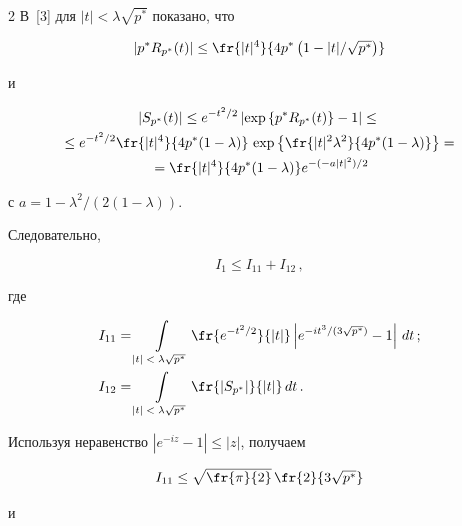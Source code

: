 \begin{multicols}{2}
В~[3] для  $|t| < \lambda \sqrt{p^*}$  показано, что

\begin{equation*}

\left\vert p^* R_{p^*}(t)\right\vert \leq \fr{|t|^4}{4p^*\left(1 -|t|/\sqrt{p^*}\right)}

\end{equation*}

и

\begin{multline*}

\left\vert S_{p^*}(t)\right\vert \leq e^{-t^2/2} \left\vert \exp \left\{p^* R_{p^*}(t)\right\} - 1\right\vert \leq{}\\

{}\leq e^{-t^2/2} \fr{|t|^4}{4p^* (1-\lambda)}\,

             \exp \left\{\fr{|t|^2 \lambda^2}{4p^*(1 -\lambda)} \right\}={}\\

{}             =  \fr{|t|^4}{4p^* (1-\lambda)} e^{-(-a|t|^2)/2}

\end{multline*}

с $a = 1 - \lambda^2 /(2(1-\lambda))$.

Следовательно,

\begin{equation*}

I_1 \le I_{11} +I_{12}\,,

\end{equation*}

где

\begin{align*}

I_{11} &= \int\limits_{|t| \;<\; \lambda \sqrt{p^*}} \fr{e^{-t^2/2}}{|t|}

\left| e^{-it^3/(3\sqrt{p^*})} - 1\right|\,dt\,;\\

I_{12} &= \int\limits_{|t|\; <\; \lambda \sqrt{p^*}} \fr{|S_{p^*}|}{|t|}\,dt\,.

\end{align*}

Используя неравенство $|e^{-iz} -1| \le |z|$, получаем

$$

I_{11}\leq \sqrt{\fr{\pi}{2}}\,\fr{2}{3\sqrt{p^*}}

$$

и

\begin{multline*}


\end{multline*}
\end{multicols}
